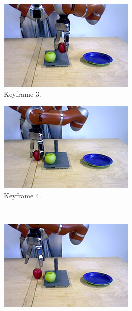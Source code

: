 \begin{figure}
\begin{subfigure}[t]{0.475\textwidth}
    \includegraphics[width=\textwidth]{./figures/sec/planning/exec2/frame0892.jpg}
    \caption{Keyframe 3.}
    \label{fig:sec_usingaffordanceforplanning_results_scenario2_3}
  \end{subfigure}
  \hfill
  \begin{subfigure}[t]{0.475\textwidth}
    \includegraphics[width=\textwidth]{./figures/sec/planning/exec2/frame1066.jpg}
    \caption{Keyframe 4.}
    \label{fig:sec_usingaffordanceforplanning_results_scenario2_4}
  \end{subfigure}\\%
  \begin{subfigure}[t]{0.475\textwidth}
    \includegraphics[width=\textwidth]{./figures/sec/planning/exec2/frame1164.jpg}

\end{subfigure}
\end{figure}
